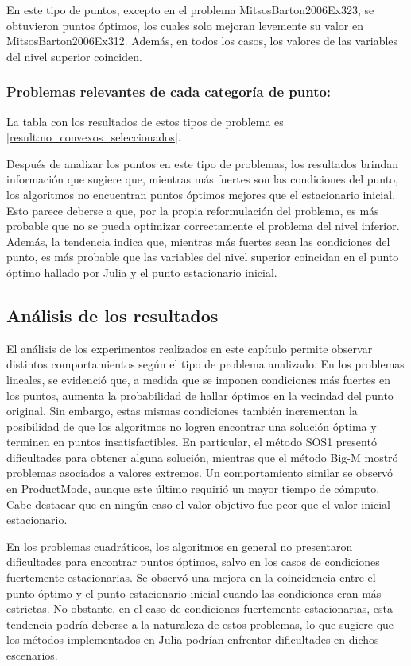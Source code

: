 En este tipo de puntos, excepto en el problema MitsosBarton2006Ex323,
 se obtuvieron puntos óptimos, 
 los cuales solo mejoran levemente su valor en MitsosBarton2006Ex312. 
 Además, en todos los casos, los valores de las variables del nivel superior coinciden.
     

\subsubsection{Problemas relevantes de cada categoría de punto:}
La tabla con los resultados de estos tipos de problema es \ref{result:no_convexos_seleccionados}.

Después de analizar los puntos en este tipo de problemas, los resultados brindan información que sugiere que, mientras más fuertes son las condiciones del punto, los algoritmos no encuentran puntos óptimos mejores que el estacionario inicial. Esto parece deberse a que, por la propia reformulación del problema, es más probable que no se pueda optimizar correctamente el problema del nivel inferior. Además, la tendencia indica que, mientras más fuertes sean las condiciones del punto, es más probable que las variables del nivel superior coincidan en el punto óptimo hallado por Julia y el punto estacionario inicial.
  


\subsection{Análisis de los resultados}


El análisis de los experimentos realizados en este capítulo permite observar distintos comportamientos según el tipo de problema analizado.
En los problemas lineales, se evidenció que, a medida que se imponen condiciones más fuertes en los puntos, aumenta la probabilidad de hallar óptimos en la vecindad del punto original. 
Sin embargo, estas mismas condiciones también incrementan la posibilidad de que los algoritmos no logren encontrar una solución óptima y terminen en puntos insatisfactibles. 
En particular, el método SOS1 presentó dificultades para obtener alguna solución, mientras que el método Big-M mostró problemas asociados a valores extremos. 
Un comportamiento similar se observó en ProductMode, aunque este último requirió un mayor tiempo de cómputo. 
Cabe destacar que en ningún caso el valor objetivo fue peor que el valor inicial estacionario.  

En los problemas cuadráticos, los algoritmos en general no presentaron dificultades para encontrar puntos óptimos, salvo en los casos de condiciones fuertemente estacionarias. 
Se observó una mejora en la coincidencia entre el punto óptimo y el punto estacionario inicial cuando las condiciones eran más estrictas. 
No obstante, en el caso de condiciones fuertemente estacionarias, esta tendencia podría deberse a la naturaleza de estos problemas, 
lo que sugiere que los métodos implementados en Julia podrían enfrentar dificultades en dichos escenarios. 
 
